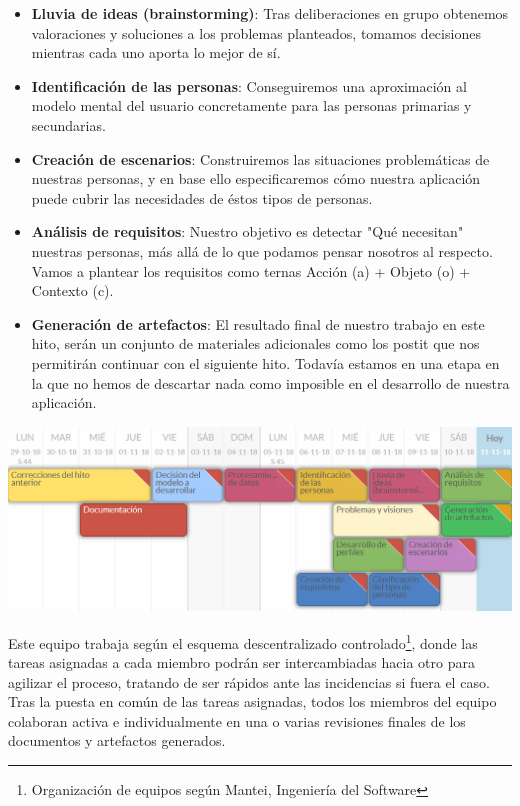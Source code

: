 \documentclass[12pt]{article}
\begin{document}
\begin{itemize}
\item \textbf{Lluvia de ideas (brainstorming)}: Tras deliberaciones en grupo obtenemos valoraciones y soluciones a los problemas planteados, tomamos decisiones mientras cada uno aporta lo mejor de sí.


\item \textbf{Identificación de las personas}: Conseguiremos una aproximación al modelo mental del usuario concretamente para las personas primarias y secundarias.


\item \textbf{Creación de escenarios}​: Construiremos las situaciones problemáticas de nuestras personas, y en base ello especificaremos cómo nuestra aplicación puede cubrir las necesidades de éstos tipos de personas.

\item \textbf{Análisis de requisitos}​: Nuestro objetivo es detectar "Qué necesitan" nuestras personas, más allá de lo que podamos pensar nosotros al respecto. Vamos a plantear los requisitos como ternas Acción (a) + Objeto (o) + Contexto (c).


\item \textbf{Generación de artefactos}​: El resultado final de nuestro trabajo en este hito, serán un conjunto de materiales adicionales como los postit que nos permitirán continuar con el siguiente hito. Todavía estamos en una etapa en la que no hemos de descartar nada como imposible en el desarrollo de nuestra aplicación.

\end{itemize}


\begin{center}
	\includegraphics[width=1\textwidth]{planificacionHito2.png}
\end{center}
\phantom{10}

Este equipo trabaja según el esquema descentralizado controlado\footnote{Organización de equipos según Mantei, Ingeniería del Software}, donde las tareas asignadas a cada miembro podrán ser intercambiadas hacia otro para agilizar el proceso, tratando de ser rápidos ante las incidencias si fuera el caso. Tras la puesta en común de las tareas asignadas, todos los miembros del equipo colaboran activa e individualmente en una o varias revisiones finales de los documentos y artefactos generados.
\end{document}
